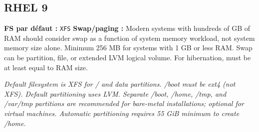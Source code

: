 \documentclass[10pt,a4paper]{article}
\begin{document}
\subsection{RHEL 9}
\noindent\small \textbf{FS par d\'efaut :} \texttt{XFS} \quad\textbullet\quad \textbf{Swap/paging :} Modern systems with hundreds of GB of RAM should consider swap as a function of system memory workload, not system memory size alone. Minimum 256 MB for systems with 1 GB or less RAM. Swap can be partition, file, or extended LVM logical volume. For hibernation, must be at least equal to RAM size.\normalsize\par\smallskip
\noindent\small\textit{Default filesystem is XFS for / and data partitions. /boot must be ext4 (not XFS). Default partitioning uses LVM. Separate /boot, /home, /tmp, and /var/tmp partitions are recommended for bare-metal installations; optional for virtual machines. Automatic partitioning requires 55 GiB minimum to create /home.}\normalsize\par\smallskip
\end{document}
